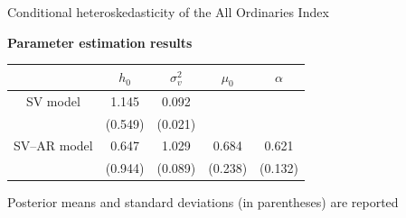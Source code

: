 \documentclass[notes,blackandwhite,mathsans,usenames,dvipsnames]{beamer}
\begin{document}
\begin{frame}{Conditional heteroskedasticity of the All Ordinaries Index}
\begin{center}
\textbf{Parameter estimation results}

\bigskip
\begin{tabular}{ccccc}
\toprule
& $h_0$ & $\sigma_v^2$ & $\mu_0$ & $\alpha$\\
\midrule
SV model&1.145 & 0.092 &&\\
&(0.549) & (0.021)  &&\\[1ex]
SV--AR model&0.647 & 1.029 & 0.684 & 0.621\\
&(0.944) & (0.089) & (0.238) & (0.132) \\[1ex]
\bottomrule
\end{tabular}

\bigskip\small Posterior means and standard deviations (in parentheses) are reported
\end{center}
\end{frame}
\end{document}
